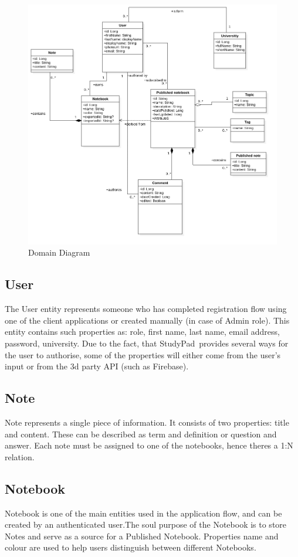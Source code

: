 \documentclass[thesis=B,english]{FITthesis}[2012/10/20]
\newcommand{\appname}{StudyPad}
\begin{document}
\begin{figure}[H]
  \includegraphics[width=\linewidth]{Domain}
  \caption{Domain Diagram}
  \label{fig:domain}
\end{figure}

 

\subsection{User}
	The User entity represents someone who has completed registration flow using one of the client applications or created manually (in case of Admin role). This entity contains such properties as: role, first name, last name, email address, password, university. Due to the fact, that \appname\ provides several ways for the user to authorise, some of the properties will either come from the user's input or from the 3d party API (such as Firebase).
	
\subsection{Note}
	Note represents a single piece of information. It consists of two properties: title and content. These can be described as term and definition or question and answer. Each note must be assigned to one of the notebooks, hence theres a 1:N relation.
\subsection{Notebook}
	Notebook is one of the main entities used in the application flow, and  can be created by an authenticated user.The soul purpose of the Notebook is to store Notes and serve as a source for a Published Notebook. Properties name and colour are used to help users distinguish between different Notebooks.
	
\end{document}
